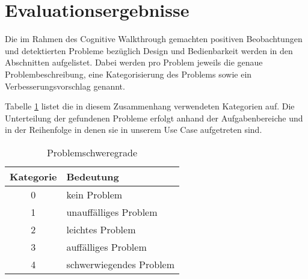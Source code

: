 ﻿\section{Evaluationsergebnisse}
Die im Rahmen des Cognitive Walkthrough gemachten positiven Beobachtungen und detektierten Probleme bezüglich Design und Bedienbarkeit werden in den Abschnitten aufgelistet. Dabei werden pro Problem jeweils die genaue Problembeschreibung, eine Kategorisierung des Problems sowie ein Verbesserungsvorschlag genannt.

Tabelle \ref{tbl:categories} listet die in diesem Zusammenhang verwendeten Kategorien auf. Die Unterteilung der gefundenen Probleme erfolgt anhand der Aufgabenbereiche und in der Reihenfolge in denen sie in unserem Use Case aufgetreten sind.

\begin{table}[h]
	\centering\begin{tabular}{|c|l|}
		\hline
		\textbf{Kategorie} & \textbf{Bedeutung} \\
		\hline
		0 & kein Problem \\
		1 & unauffälliges Problem \\
		2 & leichtes Problem \\
		3 & auffälliges Problem \\
		4 & schwerwiegendes Problem \\
		\hline
	\end{tabular}
	\caption{Problemschweregrade\label{tbl:categories}}
\end{table}